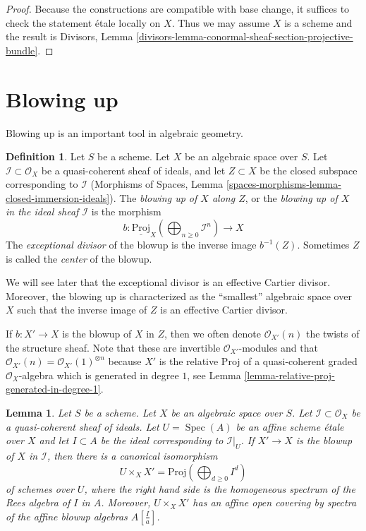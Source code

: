 \documentclass{stacks-project}
\theoremstyle{plain}
\newtheorem{lemma}[subsection]{Lemma}
\theoremstyle{definition}
\newtheorem{definition}[subsection]{Definition}
\theoremstyle{remark}
\numberwithin{equation}{subsection}
\def\Spec{\mathop{\mathrm{Spec}}}
\begin{document}
\begin{proof}
Because the constructions are compatible with base change, it suffices to
check the statement \'etale locally on $X$. Thus we may assume $X$ is
a scheme and the result is
Divisors, Lemma \ref{divisors-lemma-conormal-sheaf-section-projective-bundle}.
\end{proof}






\section{Blowing up}
\label{section-blowing-up}

\noindent
Blowing up is an important tool in algebraic geometry.

\begin{definition}
\label{definition-blow-up}
Let $S$ be a scheme. Let $X$ be an algebraic space over $S$.
Let $\mathcal{I} \subset \mathcal{O}_X$ be a quasi-coherent sheaf
of ideals, and let $Z \subset X$ be the closed subspace corresponding
to $\mathcal{I}$
(Morphisms of Spaces, Lemma
\ref{spaces-morphisms-lemma-closed-immersion-ideals}).
The {\it blowing up of $X$ along $Z$}, or the
{\it blowing up of $X$ in the ideal sheaf $\mathcal{I}$} is
the morphism
$$
b :
\underline{\text{Proj}}_X
\left(\bigoplus\nolimits_{n \geq 0} \mathcal{I}^n\right)
\longrightarrow
X
$$
The {\it exceptional divisor} of the blowup is the inverse image
$b^{-1}(Z)$. Sometimes $Z$ is called the {\it center} of the blowup.
\end{definition}

\noindent
We will see later that the exceptional divisor is an effective Cartier
divisor. Moreover, the blowing up is characterized as the ``smallest''
algebraic space over $X$ such that the inverse image of $Z$ is an
effective Cartier divisor.

\medskip\noindent
If $b : X' \to X$ is the blowup of $X$ in $Z$, then we often denote
$\mathcal{O}_{X'}(n)$ the twists of the structure sheaf. Note that these
are invertible $\mathcal{O}_{X'}$-modules and that
$\mathcal{O}_{X'}(n) = \mathcal{O}_{X'}(1)^{\otimes n}$
because $X'$ is the relative Proj of a quasi-coherent graded
$\mathcal{O}_X$-algebra which is generated in degree $1$, see
Lemma \ref{lemma-relative-proj-generated-in-degree-1}.

\begin{lemma}
\label{lemma-blowing-up-affine}
Let $S$ be a scheme. Let $X$ be an algebraic space over $S$.
Let $\mathcal{I} \subset \mathcal{O}_X$ be a
quasi-coherent sheaf of ideals. Let $U = \Spec(A)$ be an affine scheme
\'etale over $X$ and let $I \subset A$ be the ideal corresponding to
$\mathcal{I}|_U$. If $X' \to X$ is the blowup of $X$ in $\mathcal{I}$,
then there is a canonical isomorphism
$$
U \times_X X' = \text{Proj}(\bigoplus\nolimits_{d \geq 0} I^d)
$$
of schemes over $U$, where the right hand side is
the homogeneous spectrum of the Rees algebra of $I$ in $A$.
Moreover, $U \times_X X'$ has an affine open covering by
spectra of the affine blowup algebras $A[\frac{I}{a}]$.
\end{lemma}
\end{document}
